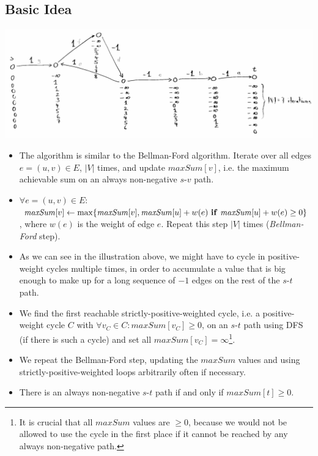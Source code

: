 \documentclass[12pt]{article}
\begin{document}
\subsection*{Basic Idea}
\includegraphics[width=\textwidth]{5_1.pdf}
\begin{itemize}
	\item The algorithm is similar to the Bellman-Ford algorithm. Iterate over all edges $e=(u,v) \in E$, $|V|$ times, and update $\mathit{maxSum}[v]$, i.e. the maximum achievable sum on an always non-negative $s$-$v$ path.
	\item $\forall e=(u,v) \in E$: $\mathit{maxSum}[v] \gets \max \{\mathit{maxSum}[v], \mathit{maxSum}[u] + w(e) \mbox{ \textbf{if} } \mathit{maxSum}[u] + w(e) \geq 0\}$, where $w(e)$ is the weight of edge $e$. Repeat this step $|V|$ times (\emph{Bellman-Ford} step).
	\item As we can see in the illustration above, we might have to cycle in positive-weight cycles multiple times, in order to accumulate a value that is big enough to make up for a long sequence of $-1$ edges on the rest of the $s$-$t$ path.
	\item We find the first reachable strictly-positive-weighted cycle, i.e. a positive-weight cycle $C$ with $\forall v_C \in C: \mathit{maxSum}[v_C] \geq 0$, on an $s$-$t$ path using DFS (if there is such a cycle) and set all $\mathit{maxSum}[v_C] = \infty$\footnote{It is crucial that all $\mathit{maxSum}$ values are $\geq 0$, because we would not be allowed to use the cycle in the first place if it cannot be reached by any always non-negative path.}.
	\item We repeat the Bellman-Ford step, updating the $\mathit{maxSum}$ values and using strictly-positive-weighted loops arbitrarily often if necessary.
	\item There is an always non-negative $s$-$t$ path if and only if $\mathit{maxSum}[t] \geq 0$.
\end{itemize}
\end{document}
